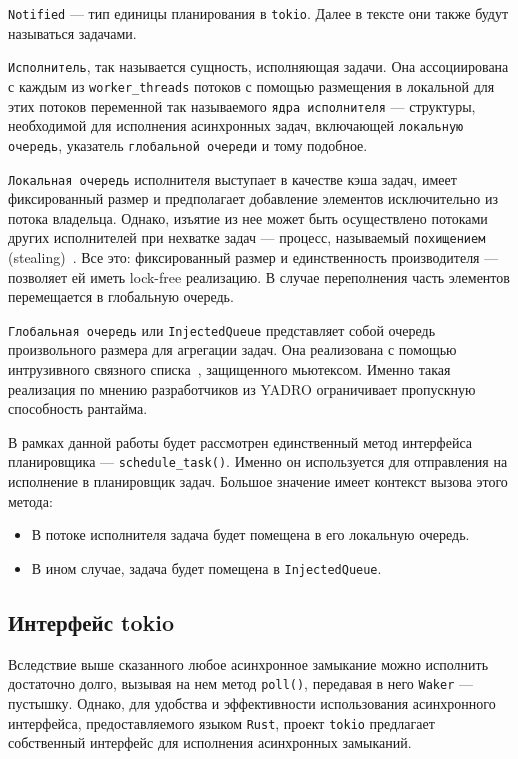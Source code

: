 \verb|Notified| --- тип единицы планирования в \verb|tokio|. Далее в тексте они также будут называться задачами.

\verb|Исполнитель|, так называется сущность, исполняющая задачи. Она ассоциирована с каждым из \verb|worker_threads| потоков с помощью размещения в локальной для этих потоков переменной так называемого \verb|ядра исполнителя| --- структуры, необходимой для исполнения асинхронных задач, включающей \verb|локальную очередь|, указатель \verb|глобальной очереди| и тому подобное.

\verb|Локальная очередь| исполнителя выступает в качестве кэша задач, имеет фиксированный размер и предполагает добавление элементов  исключительно из потока владельца. Однако, изъятие из нее может быть осуществлено потоками других исполнителей при нехватке задач --- процесс, называемый \verb|похищением| (stealing)~\cite{cringeTokioIOUring}. Все это: фиксированный размер и единственность производителя --- позволяет ей иметь lock-free реализацию. В случае переполнения часть элементов перемещается в глобальную очередь.

\verb|Глобальная очередь| или \verb|InjectedQueue| представляет собой очередь произвольного размера для агрегации задач. Она реализована с помощью интрузивного связного списка~\cite{queues}, защищенного мьютексом. Именно такая реализация по мнению разработчиков из YADRO ограничивает пропускную способность рантайма.

В рамках данной работы будет рассмотрен единственный метод интерфейса планировщика --- \verb|schedule_task()|. Именно он используется для отправления на исполнение в планировщик задач. Большое значение имеет контекст вызова этого метода:

\begin{itemize}
    \item В потоке исполнителя задача будет помещена в его локальную очередь.
    \item В ином случае, задача будет помещена в \verb|InjectedQueue|.
\end{itemize}

\subsection{Интерфейс tokio}

Вследствие выше сказанного любое асинхронное замыкание можно исполнить достаточно долго, вызывая на нем метод \verb|poll()|, передавая в него \verb|Waker| --- пустышку. Однако, для удобства и эффективности использования асинхронного интерфейса, предоставляемого языком \verb|Rust|, проект \verb|tokio| предлагает собственный интерфейс для исполнения асинхронных замыканий.

